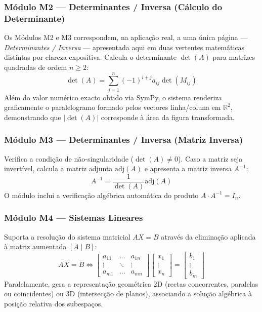 \documentclass[conference]{IEEEtran}
\begin{document}
\subsubsection{Módulo M2 --- Determinantes / Inversa (Cálculo do Determinante)}
Os Módulos M2 e M3 correspondem, na aplicação real, a uma única página --- \textit{Determinantes / Inversa} --- apresentada aqui em duas vertentes matemáticas distintas por clareza expositiva. Calcula o determinante $\det(A)$ para matrizes quadradas de ordem $n \geq 2$:
\begin{equation}
\det(A) = \sum_{j=1}^{n} (-1)^{i+j} a_{ij} \det(M_{ij})
\label{eq:determinante}
\end{equation}
Além do valor numérico exacto obtido via SymPy, o sistema renderiza graficamente o paralelogramo formado pelos vectores linha/coluna em $\mathbb{R}^2$, demonstrando que $|\det(A)|$ corresponde à área da figura transformada.

\subsubsection{Módulo M3 --- Determinantes / Inversa (Matriz Inversa)}
Verifica a condição de não-singularidade ($\det(A) \neq 0$). Caso a matriz seja invertível, calcula a matriz adjunta $\mathrm{adj}(A)$ e apresenta a matriz inversa $A^{-1}$:
\begin{equation}
A^{-1} = \frac{1}{\det(A)} \mathrm{adj}(A)
\label{eq:inversa}
\end{equation}
O módulo inclui a verificação algébrica automática do produto $A \cdot A^{-1} = I_n$.

\subsubsection{Módulo M4 --- Sistemas Lineares}
Suporta a resolução do sistema matricial $AX = B$ através da eliminação aplicada à matriz aumentada $[A \mid B]$:
\begin{equation}
AX = B \iff
\begin{bmatrix} a_{11} & \dots & a_{1n} \\ \vdots & \ddots & \vdots \\ a_{m1} & \dots & a_{mn} \end{bmatrix}
\begin{bmatrix} x_1 \\ \vdots \\ x_n \end{bmatrix} =
\begin{bmatrix} b_1 \\ \vdots \\ b_m \end{bmatrix}
\label{eq:sistema}
\end{equation}
Paralelamente, gera a representação geométrica 2D (rectas concorrentes, paralelas ou coincidentes) ou 3D (intersecção de planos), associando a solução algébrica à posição relativa dos subespaços.
\end{document}
